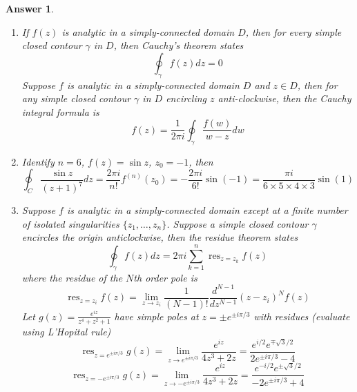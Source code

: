 \documentclass[a4paper]{article}
\DeclareMathOperator{\res}{res}
\newtheorem{ans}{Answer}[section]
\theoremstyle{new}
\begin{document}
\begin{ans}\leavevmode
\begin{enumerate}[label=(\alph*)]
\item If $f(z)$ is analytic in a simply-connected domain $D$, then for every simple closed contour $\gamma$ in $D$, then Cauchy's theorem states
$$\oint_\gamma f(z)dz=0$$
Suppose $f$ is analytic in a simply-connected domain $D$ and $z\in D$, then for any simple closed contour $\gamma$ in $D$ encircling $z$ anti-clockwise, then the Cauchy integral formula is
$$f(z)=\frac{1}{2\pi i}\oint_{\gamma}\frac{f(w)}{w-z}dw$$
\item Identify $n=6$, $f(z)=\sin z$, $z_0=-1$, then
$$\oint_C\frac{\sin z}{(z+1)^7}dz=\frac{2\pi i}{n!}f^{(n)}(z_0)=-\frac{2\pi i}{6!}\sin(-1)=\frac{\pi i}{6\times 5\times 4\times 3}\sin (1)$$
\item Suppose $f$ is analytic in a simply-connected domain except at a finite number of isolated singularities $\{z_1,\dots,z_n\}$. Suppose a simple closed contour $\gamma$ encircles the origin anticlockwise, then the residue theorem states
$$\oint_\gamma f(z)dz=2\pi i\sum_{k=1}^n\res_{z=z_k}f(z)$$
where the residue of the $N$th order pole is
$$\res_{z=z_i}f(z)=\lim_{z\rightarrow z_i}\frac{1}{(N-1)!}\frac{d^{N-1}}{dz^{N-1}}(z-z_i)^Nf(z)$$
Let $g(z)=\frac{e^{iz}}{z^4+z^2+1}$ have simple poles at $z=\pm e^{\pm i\pi/3}$ with residues (evaluate using L'Hopital rule)
$$\res_{z=e^{\pm i\pi/3}}g(z)=\lim_{z\rightarrow e^{\pm i\pi/3}}\frac{e^{iz}}{4z^3+2z}=\frac{e^{i/2}e^{\mp\sqrt{3}/2}}{2e^{\pm i\pi/3}-4}$$
$$\res_{z=-e^{\pm i\pi/3}}g(z)=\lim_{z\rightarrow -e^{\pm i\pi/3}}\frac{e^{iz}}{4z^3+2z}=\frac{e^{-i/2}e^{\pm\sqrt{3}/2}}{-2e^{\pm i\pi/3}+4}$$
\begin{center}
\end{center}
\end{enumerate}
\end{ans}
\end{document}
